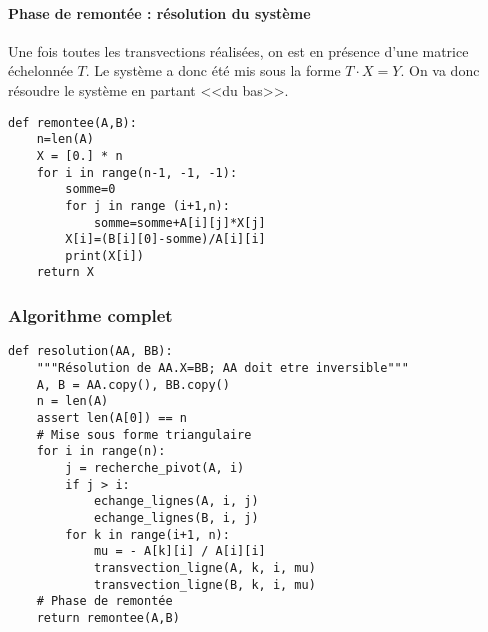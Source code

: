 {\paragraph*{Phase de remontée : résolution du système}
Une fois toutes les transvections réalisées, on est en présence d'une matrice échelonnée $T$. Le système a donc été mis sous la forme $T\cdot X = Y$. On va donc résoudre le système en partant <<du bas>>.

\begin{lstlisting}
def remontee(A,B):
    n=len(A)
    X = [0.] * n
    for i in range(n-1, -1, -1):
        somme=0
        for j in range (i+1,n):
            somme=somme+A[i][j]*X[j]
        X[i]=(B[i][0]-somme)/A[i][i]
        print(X[i])
    return X
\end{lstlisting}

 

\subsubsection{Algorithme complet}

\begin{lstlisting}
def resolution(AA, BB):
    """Résolution de AA.X=BB; AA doit etre inversible"""
    A, B = AA.copy(), BB.copy()
    n = len(A)
    assert len(A[0]) == n
    # Mise sous forme triangulaire
    for i in range(n):
        j = recherche_pivot(A, i)
        if j > i:
            echange_lignes(A, i, j)
            echange_lignes(B, i, j)
        for k in range(i+1, n):
            mu = - A[k][i] / A[i][i]
            transvection_ligne(A, k, i, mu)
            transvection_ligne(B, k, i, mu)
    # Phase de remontée
    return remontee(A,B)
\end{lstlisting}

%
%

}
